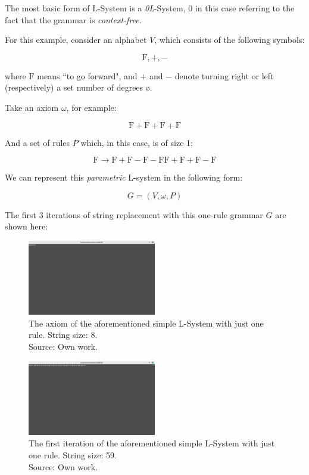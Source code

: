 The most basic form of L-System is a \emph{0L}-System, 0 in this case referring to the fact that the grammar is \emph{context-free}.

For this example\cite{lsyspaulbourke}, consider an alphabet $V$, which consists of the following symbols:

\newcommand{\F}{\mbox{F}}

$$ \F, +, - $$

where $\F$ means ``to go forward", and $+$ and $-$ denote turning right or left (respectively) a set number of degrees \o.

Take an axiom $\omega$, for example:

$$ \F+\F+\F+\F $$

And a set of rules $P$ which, in this case, is of size 1:

$$ \F \rightarrow \F+\F-\F-\F\F+\F+\F-\F $$

We can represent this \emph{parametric} L-system in the following form:\cite{houdinilsystems}

$$ G = (V, \omega, P) $$

The first 3 iterations of string replacement with this one-rule grammar $G$ are shown here:

\begin{figure}[H]
	\centering
	\includegraphics[width=0.5\textwidth]{Images/initial-l-system-iteration-0.png}
	\caption{The axiom of the aforementioned simple L-System with just one rule. String size: 8.\\Source: Own work.}
	\label{fig:lsysiter0}
\end{figure}

\begin{figure}[H]
	\centering
	\includegraphics[width=0.5\textwidth]{Images/initial-l-system-iteration-1.png}
	\caption{The first iteration of the aforementioned simple L-System with just one rule. String size: 59.\\Source: Own work.}
	\label{fig:lsysiter1}
\end{figure}

